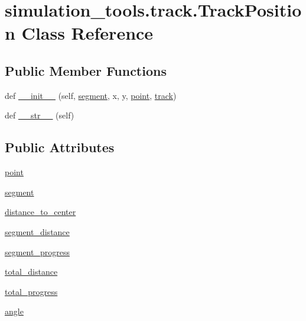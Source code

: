 \hypertarget{classsimulation__tools_1_1track_1_1_track_position}{}\section{simulation\+\_\+tools.\+track.\+Track\+Position Class Reference}
\label{classsimulation__tools_1_1track_1_1_track_position}
\subsection*{Public Member Functions}
\begin{DoxyCompactItemize}
\item 
def \hyperlink{classsimulation__tools_1_1track_1_1_track_position_a05040be982ee5680d839a98dc15a26c9}{\+\_\+\+\_\+init\+\_\+\+\_\+} (self, \hyperlink{classsimulation__tools_1_1track_1_1_track_position_ab5feb6f2789576c88fe7310f28e4c4db}{segment}, x, y, \hyperlink{classsimulation__tools_1_1track_1_1_track_position_a5c5ad2aecf6e00e6611e8ad70b38de7b}{point}, \hyperlink{namespacesimulation__tools_1_1track_ac731095c2502c445d46302406cb81651}{track})
\item 
def \hyperlink{classsimulation__tools_1_1track_1_1_track_position_a7c60c719686ae3ae47ce5dbaad6ffbc4}{\+\_\+\+\_\+str\+\_\+\+\_\+} (self)
\end{DoxyCompactItemize}
\subsection*{Public Attributes}
\begin{DoxyCompactItemize}
\item 
\hyperlink{classsimulation__tools_1_1track_1_1_track_position_a5c5ad2aecf6e00e6611e8ad70b38de7b}{point}
\item 
\hyperlink{classsimulation__tools_1_1track_1_1_track_position_ab5feb6f2789576c88fe7310f28e4c4db}{segment}
\item 
\hyperlink{classsimulation__tools_1_1track_1_1_track_position_a1d45644ad2113e0c7a8e546f52015d46}{distance\+\_\+to\+\_\+center}
\item 
\hyperlink{classsimulation__tools_1_1track_1_1_track_position_a89c184a72d3b1636bf9531de144374e4}{segment\+\_\+distance}
\item 
\hyperlink{classsimulation__tools_1_1track_1_1_track_position_a1ce2f49333cc2e6d5ac1094a3e919eeb}{segment\+\_\+progress}
\item 
\hyperlink{classsimulation__tools_1_1track_1_1_track_position_a488a7374a672827079686cf7fece12ee}{total\+\_\+distance}
\item 
\hyperlink{classsimulation__tools_1_1track_1_1_track_position_a0471b3519ccab2dfd048ed02853f8a8d}{total\+\_\+progress}
\item 
\hyperlink{classsimulation__tools_1_1track_1_1_track_position_a4809c7245ab044b2b3ca96fbdc80fe72}{angle}
\end{DoxyCompactItemize}


